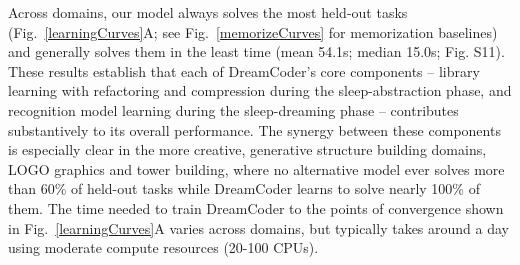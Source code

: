 \documentclass[12pt]{article}
\begin{document}
Across domains, our model always solves the most held-out tasks (Fig.~\ref{learningCurves}A; see Fig.~\ref{memorizeCurves} for memorization baselines) and generally solves them in the least time (mean 54.1s; median 15.0s; Fig. S11).
These results establish that each of DreamCoder's core components -- library learning with refactoring and compression during the sleep-abstraction phase, and recognition model learning during the sleep-dreaming phase -- contributes substantively to its overall performance.
The synergy between these components is especially clear in the more creative, generative structure building domains, LOGO graphics and tower building, where no alternative model ever solves more than 60\% of held-out tasks while DreamCoder learns to solve nearly 100\% of them. 
The time needed to train DreamCoder to the points of convergence shown in Fig.~\ref{learningCurves}A %
varies across domains, but typically takes around a day using moderate compute resources (20-100 CPUs). 
\end{document}
